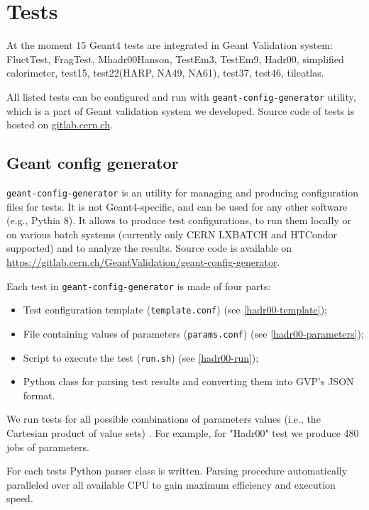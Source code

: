 \section{Tests}
\label{sec-tests}

At the moment 15 Geant4 tests are integrated in Geant Validation system: FluctTest, FragTest, Mhadr00Hanson, TestEm3, TestEm9, Hadr00, simplified calorimeter, test15, test22(HARP, NA49, NA61), test37, test46, tileatlas.

All listed tests can be configured and run with {\tt geant-config-generator} utility, which is a part of Geant validation system we developed. Source code of tests is hosted on \url{gitlab.cern.ch}.

\subsection{Geant config generator}
\label{sec-geant-config-generator}

{\tt geant-config-generator} is an utility for managing and producing configuration files for tests. It is not Geant4-specific, and can be used for any other software (e.g., Pythia 8). It allows to produce test configurations, to run them locally or on various batch systems (currently only CERN LXBATCH and HTCondor supported) and to analyze the results. Source code is available on \url{https://gitlab.cern.ch/GeantValidation/geant-config-generator}.

Each test in {\tt geant-config-generator} is made of four parts:

\begin{itemize}
	\item Test configuration template ({\tt template.conf}) (see \ref{hadr00-template});
	\item File containing values of parameters ({\tt params.conf}) (see \ref{hadr00-parameters});
	\item Script to execute the test ({\tt run.sh}) (see \ref{hadr00-run});
	\item Python class for parsing test results and converting them into GVP's JSON format.
\end{itemize}

We run tests for all possible combinations of parameters values (i.e., the Cartesian product of value sets) . For example, for "Hadr00" test we produce 480 jobs of parameters.

For each tests Python parser class is written. Parsing procedure automatically paralleled over all available CPU to gain maximum efficiency and execution speed.


